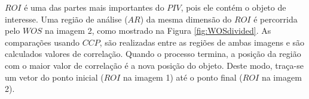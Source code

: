$ROI$ é uma das partes mais importantes do $PIV$, pois ele contém o objeto de interesse. Uma região de análise
($AR$) da mesma dimensão do $ROI$ é percorrida pelo $WOS$ na imagem 2, como mostrado na Figura \ref{fig:WOSdivided}.
As comparações usando $CCP$, são realizadas entre as regiões de ambas imagens e são 
calculados valores de correlação. Quando o processo termina, a posição da região com o maior valor
de correlação é a nova posição do objeto. Deste modo, traça-se um vetor do ponto inicial ($ROI$ na imagem 1) até o ponto final
($ROI$ na imagem 2).
